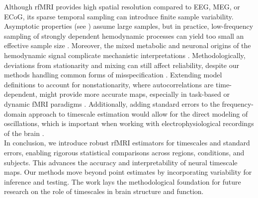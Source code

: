 \documentclass[docs/main.tex]{subfiles}
\begin{document}
Although rfMRI provides high spatial resolution compared to EEG, MEG, or ECoG, its sparse temporal sampling can introduce finite sample variability. Asymptotic properties (see ) assume large samples, but in practice, low-frequency sampling of strongly dependent hemodynamic processes can yield too small an effective sample size \citep{afyouni_effective_2019, kaneoke_variance_2012}. Moreover, the mixed metabolic and neuronal origins of the hemodynamic signal complicate mechanistic interpretations \citep{raut_hierarchical_2020, he_scale-free_2011}. Methodologically, deviations from stationarity and mixing can still affect reliability, despite our methods handling common forms of misspecification \citep[Chapter~14.7]{hansen_econometrics_2022}. Extending model definitions to account for nonstationarity, where autocorrelations are time-dependent, might provide more accurate maps, especially in task-based or dynamic fMRI paradigms \citep{he_scale-free_2011}. Additionally, adding standard errors to the frequency-domain approach to timescale estimation would allow for the direct modeling of oscillations, which is important when working with electrophysiological recordings of the brain \citep{donoghue_parameterizing_2020, gao_neuronal_2020}.\\

In conclusion, we introduce robust rfMRI estimators for timescales and standard errors, enabling rigorous statistical comparisons across regions, conditions, and subjects. This advances the accuracy and interpretability of neural timescale maps. Our methods move beyond point estimates by incorporating variability for inference and testing. The work lays the methodological foundation for future research on the role of timescales in brain structure and function.
\end{document}
